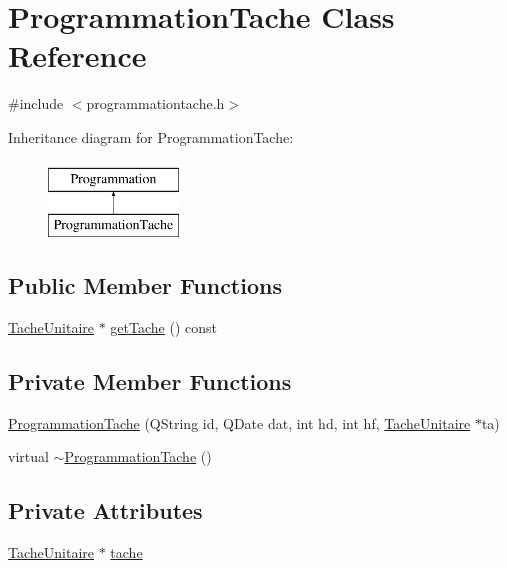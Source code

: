 \hypertarget{class_programmation_tache}{}\section{Programmation\+Tache Class Reference}
\label{class_programmation_tache}


{\ttfamily \#include $<$programmationtache.\+h$>$}

Inheritance diagram for Programmation\+Tache\+:\begin{figure}[H]
\begin{center}
\leavevmode
\includegraphics[height=2.000000cm]{class_programmation_tache}
\end{center}
\end{figure}
\subsection*{Public Member Functions}
\begin{DoxyCompactItemize}
\item 
\hyperlink{class_tache_unitaire}{Tache\+Unitaire} $\ast$ \hyperlink{class_programmation_tache_a768420cbc2955fbd0fa4d51651e883f0}{get\+Tache} () const 
\end{DoxyCompactItemize}
\subsection*{Private Member Functions}
\begin{DoxyCompactItemize}
\item 
\hyperlink{class_programmation_tache_a3e3ed2c9849c76f431ad9ae80e1832a9}{Programmation\+Tache} (Q\+String id, Q\+Date dat, int hd, int hf, \hyperlink{class_tache_unitaire}{Tache\+Unitaire} $\ast$ta)
\item 
virtual \hyperlink{class_programmation_tache_a3dae2689c0f94e4f33dd19a7362e498c}{$\sim$\+Programmation\+Tache} ()
\end{DoxyCompactItemize}
\subsection*{Private Attributes}
\begin{DoxyCompactItemize}
\item 
\hyperlink{class_tache_unitaire}{Tache\+Unitaire} $\ast$ \hyperlink{class_programmation_tache_a107df0f6b1dca79ca0b83739d8d177dc}{tache}
\end{DoxyCompactItemize}

